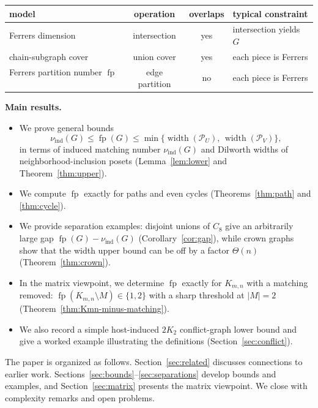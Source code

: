 \documentclass[12pt]{amsart}
\newcommand{\fp}{\operatorname{fp}}
\newcommand{\ind}{\operatorname{ind}}
\newcommand{\width}{\operatorname{width}}
\begin{document}
\begin{center}
\renewcommand{\arraystretch}{1.15}
\begin{tabular}{|l|c|c|l|}
\hline
\textbf{model} & \textbf{operation} & \textbf{overlaps} & \textbf{typical constraint} \\
\hline
Ferrers dimension~\cite{Cogis,ChatterjeeGhosh} & intersection & yes & intersection yields $G$ \\
chain-subgraph cover~\cite{MaSpinrad,BrandstadtES} & union cover & yes & each piece is Ferrers \\
Ferrers partition number $\fp$~\cite{GyorffyLondonNagyPluhar2025} & edge partition & no & each piece is Ferrers \\
\hline
\end{tabular}
\end{center}

\medskip
\noindent\textbf{Main results.}
\begin{itemize}[leftmargin=2em]
\item We prove general bounds
\[
\nu_{\ind}(G)\le \fp(G)\le \min\{\width(\mathcal P_U),\,\width(\mathcal P_V)\},
\]
in terms of induced matching number $\nu_{\ind}(G)$ and Dilworth widths of neighborhood-inclusion posets (Lemma~\ref{lem:lower} and Theorem~\ref{thm:upper}).

\item We compute $\fp$ exactly for paths and even cycles (Theorems~\ref{thm:path} and \ref{thm:cycle}).

\item We provide separation examples: disjoint unions of $C_8$ give an arbitrarily large gap $\fp(G)-\nu_{\ind}(G)$ (Corollary~\ref{cor:gap}),
while crown graphs show that the width upper bound can be off by a factor $\Theta(n)$ (Theorem~\ref{thm:crown}).

\item In the matrix viewpoint, we determine $\fp$ exactly for $K_{m,n}$ with a matching removed:
$\fp(K_{m,n}\setminus M)\in\{1,2\}$ with a sharp threshold at $|M|=2$ (Theorem~\ref{thm:Kmn-minus-matching}).

\item We also record a simple host-induced $2K_2$ conflict-graph lower bound and give a worked example illustrating the definitions (Section~\ref{sec:conflict}).
\end{itemize}

\medskip
\noindent The paper is organized as follows.
Section~\ref{sec:related} discusses connections to earlier work.
Sections~\ref{sec:bounds}--\ref{sec:separations} develop bounds and examples, and Section~\ref{sec:matrix} presents the matrix viewpoint.
We close with complexity remarks and open problems.
\end{document}
